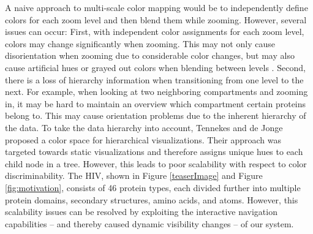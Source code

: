 \documentclass{egpubl}
\begin{document}
	A naive approach to multi-scale color mapping would be to independently define colors for each zoom level and then blend them while zooming. 
	However, several issues can occur:
	First, with independent color assignments for each zoom level, colors may change significantly when zooming.
	This may not only cause disorientation when zooming due to considerable color changes, but may also cause artificial hues or grayed out colors when blending between levels \cite{chuang2009hue}.  
	Second, there is a loss of hierarchy information when transitioning from one level to the next. 
	For example, when looking at two neighboring compartments and zooming in, it may be hard to maintain an overview which compartment certain proteins belong to. 
	This may cause orientation problems due to the inherent hierarchy of the data.
	To take the data hierarchy into account, Tennekes and de Jonge~\cite{tennekes2014tree} proposed a color space for hierarchical visualizations. 
	Their approach was targeted towards static visualizations and therefore assigns unique hues to each child node in a tree. 
	However, this leads to poor scalability with respect to color discriminability. 
	The HIV, shown in Figure \ref{teaserImage} and Figure \ref{fig:motivation}, consists of 46 protein types, each divided further into multiple protein domains, secondary structures, amino acids, and atoms. 
	However, this scalability issues can be resolved by exploiting the interactive navigation capabilities -- and thereby caused dynamic visibility changes -- of our system. 
	
	
	
\end{document}
